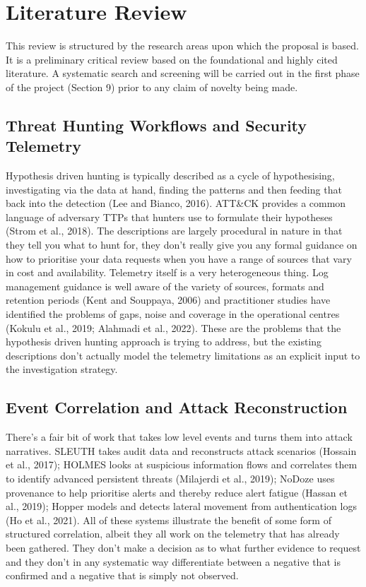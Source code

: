 \documentclass[a4paper,11pt]{article}
\begin{document}
\section{Literature Review}
This review is structured by the research areas upon which the proposal is based. It is a preliminary critical review based on the foundational and highly cited literature. A systematic search and screening will be carried out in the first phase of the project (Section 9) prior to any claim of novelty being made.\par
\subsection{Threat Hunting Workflows and Security Telemetry}
Hypothesis driven hunting is typically described as a cycle of hypothesising, investigating via the data at hand, finding the patterns and then feeding that back into the detection (Lee and Bianco, 2016). ATT\&CK provides a common language of adversary TTPs that hunters use to formulate their hypotheses (Strom et al., 2018). The descriptions are largely procedural in nature in that they tell you what to hunt for, they don't really give you any formal guidance on how to prioritise your data requests when you have a range of sources that vary in cost and availability. Telemetry itself is a very heterogeneous thing. Log management guidance is well aware of the variety of sources, formats and retention periods (Kent and Souppaya, 2006) and practitioner studies have identified the problems of gaps, noise and coverage in the operational centres (Kokulu et al., 2019; Alahmadi et al., 2022). These are the problems that the hypothesis driven hunting approach is trying to address, but the existing descriptions don't actually model the telemetry limitations as an explicit input to the investigation strategy.\par
\subsection{Event Correlation and Attack Reconstruction}
There's a fair bit of work that takes low level events and turns them into attack narratives. SLEUTH takes audit data and reconstructs attack scenarios (Hossain et al., 2017); HOLMES looks at suspicious information flows and correlates them to identify advanced persistent threats (Milajerdi et al., 2019); NoDoze uses provenance to help prioritise alerts and thereby reduce alert fatigue (Hassan et al., 2019); Hopper models and detects lateral movement from authentication logs (Ho et al., 2021). All of these systems illustrate the benefit of some form of structured correlation, albeit they all work on the telemetry that has already been gathered. They don't make a decision as to what further evidence to request and they don't in any systematic way differentiate between a negative that is confirmed and a negative that is simply not observed.\par
\end{document}
